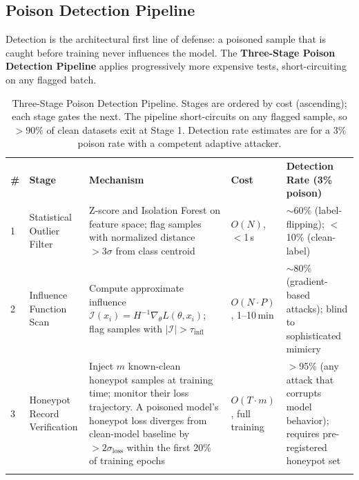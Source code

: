 \subsection{Poison Detection Pipeline}
\label{subsec:poison_detection}

Detection is the architectural first line of defense: a poisoned sample that is caught before training never influences the model. The \textbf{Three-Stage Poison Detection Pipeline} applies progressively more expensive tests, short-circuiting on any flagged batch.

\begin{table}[ht]
\centering
\caption{Three-Stage Poison Detection Pipeline. Stages are ordered by cost (ascending); each stage gates the next. The pipeline short-circuits on any flagged sample, so $>90\%$ of clean datasets exit at Stage 1. Detection rate estimates are for a 3\% poison rate with a competent adaptive attacker.}
\label{tab:poison_detection}
\renewcommand{\arraystretch}{1.3}
\begin{tabular}{p{0.4cm} p{2.5cm} p{4.5cm} p{1.5cm} p{2.8cm}}
\hline\noalign{\smallskip}
\textbf{\#} & \textbf{Stage} & \textbf{Mechanism} & \textbf{Cost} & \textbf{Detection Rate (3\% poison)} \\
\noalign{\smallskip}\svhline\noalign{\smallskip}
1 & Statistical Outlier Filter & Z-score and Isolation Forest on feature space; flag samples with normalized distance $> 3\sigma$ from class centroid & \cellcolor{costlow}$O(N)$, $<$1\,s & $\sim$60\% (label-flipping); $<$10\% (clean-label) \\[4pt]
2 & Influence Function Scan & Compute approximate influence $\mathcal{I}(x_i) = H^{-1} \nabla_\theta L(\theta, x_i)$; flag samples with $|\mathcal{I}| > \tau_{\mathrm{infl}}$ & \cellcolor{costmed}$O(N \cdot P)$, 1--10\,min & $\sim$80\% (gradient-based attacks); blind to sophisticated mimicry \\[4pt]
3 & Honeypot Record Verification & Inject $m$ known-clean honeypot samples at training time; monitor their loss trajectory. A poisoned model's honeypot loss diverges from clean-model baseline by $> 2\sigma_{\mathrm{loss}}$ within the first 20\% of training epochs & \cellcolor{costhigh}$O(T \cdot m)$, full training & $>$95\% (any attack that corrupts model behavior); requires pre-registered honeypot set \\
\noalign{\smallskip}\hline\noalign{\smallskip}
\end{tabular}
\end{table}

